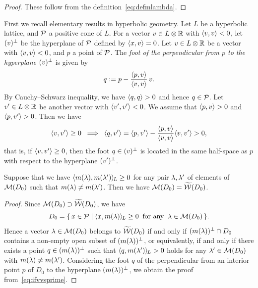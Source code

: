 \documentclass{amsart} %
\begin{document}
%
\begin{proof}
These follow from the definition~\eqref{eq:defmlambda}.
\end{proof}
%
%
First we recall elementary results in  hyperbolic geometry.
Let $L$ be a hyperbolic lattice, and $\mathord{\mathcal{P}}$ a positive cone of $L$.
For a vector $v\in L\otimes\mathord{\mathbb{R}}$ with $\langle v, v \rangle<0$,
let $(v)^{\perp}$ be the hyperplane of $\mathord{\mathcal{P}}$ defined by $\langle x, v \rangle=0$.
Let $v\in L\otimes\mathord{\mathbb{R}}$ be a vector with $\langle v, v \rangle<0$, and 
$p$  a point of $\mathord{\mathcal{P}}$.
The \emph{foot  of the perpendicular from $p$  to the hyperplane $(v)^{\perp}$ }
is given by
\[
q:=p-\frac{\langle p, v \rangle}{\langle v,v \rangle}\, v.
\]
By Cauchy--Schwarz inequality,
we have  $\langle q, q \rangle>0$
and hence 
$q\in \mathord{\mathcal{P}}$.
Let $v^{\prime}\in L\otimes\mathord{\mathbb{R}}$ be another  vector with $\langle v^{\prime}, v^{\prime} \rangle<0$.
We assume that $\langle p, v \rangle>0$ and $\langle p, v^{\prime} \rangle>0$.
Then we have
%
\begin{equation}\label{eq:ifvvsprime}
\langle v, v^{\prime} \rangle\ge 0 \;\;\Longrightarrow \;\; \langle q, v^{\prime} \rangle=
\langle p, v^{\prime} \rangle-\dfrac{\langle p, v \rangle}{\langle v,v \rangle} \langle v, v^{\prime} \rangle>0,
\end{equation}
%
that is, if $\langle v, v^{\prime} \rangle\ge 0$, 
then the foot $q\in (v)^{\perp}$ is located in the same half-space as $p$ with respect to the hyperplane 
$(v^{\prime})^{\perp}$.
%
%
\begin{lemma}\label{lem:pairsofMMM}
Suppose that  we have
$\langle m(\lambda), m(\lambda^{\prime}) \rangle_{\hskip -1pt L}\ge 0$
for any pair $\lambda, \lambda^{\prime}$ of elements of $ \mathord{\mathcal{M}}(D_0)$
such that $m(\lambda)\ne m(\lambda^{\prime})$.
Then we have 
$\mathord{\mathcal{M}}(D_0)=\widetilde{\mathord{\mathcal{W}}} (D_0)$.
\end{lemma}
%
\begin{proof}
Since $\mathord{\mathcal{M}}(D_0)\supset \widetilde{\mathord{\mathcal{W}}} (D_0)$,
 we have 
 \[
 D_0=\{\,{x\in \mathord{\mathcal{P}}}\mid {\langle x, m(\lambda) \rangle_{\hskip -1pt L}\ge 0\;\; \textrm{for any} \;\; \lambda\in \mathord{\mathcal{M}}(D_0)} \,\}.
\]
Hence a vector $\lambda\in \mathord{\mathcal{M}}(D_0)$ belongs to $\widetilde{\mathord{\mathcal{W}}} (D_0)$
if and only if 
$(m(\lambda))^{\perp} \cap D_0$ contains a non-empty open subset of $(m(\lambda))^{\perp} $,
or equivalently,
if and only if 
there exists a point $q\in (m(\lambda))^{\perp}$
such that $\langle q, m(\lambda^{\prime}) \rangle_{\hskip -1pt L}>  0$ holds for any $\lambda^{\prime}\in \mathord{\mathcal{M}}(D_0)$
with $m(\lambda)\ne m(\lambda^{\prime})$.
Considering the foot $q$ of 
the perpendicular from an interior point $p$  of $D_0$
to the hyperplane $(m(\lambda))^{\perp}$,
we obtain the proof from~\eqref{eq:ifvvsprime}.
\end{proof}
\end{document}
